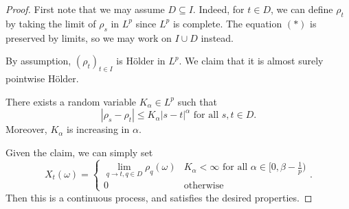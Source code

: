 \documentclass[a4paper]{article}
\begin{document}
\begin{proof}
  First note that we may assume $D \subseteq I$. Indeed, for $t \in D$, we can define $\rho_t$ by taking the limit of $\rho_s$ in $L^p$ since $L^p$ is complete. The equation $(*)$ is preserved by limits, so we may work on $I \cup D$ instead.

  By assumption, $(\rho_t)_{t \in I}$ is H\"older in $L^p$. We claim that it is almost surely pointwise H\"older.
  \begin{claim}
    There exists a random variable $K_\alpha \in L^p$ such that
    \[
      |\rho_s - \rho_t| \leq K_\alpha |s - t|^\alpha\text{ for all }s, t \in D.
    \]
    Moreover, $K_\alpha$ is increasing in $\alpha$.
  \end{claim}
  Given the claim, we can simply set
  \[
    X_t(\omega) =
    \begin{cases}
      \lim_{q \to t, q \in D} \rho_q(\omega) & K_\alpha < \infty\text{ for all }\alpha \in [0, \beta - \frac{1}{p})\\
      0 & \text{otherwise}
    \end{cases}.
  \]
  Then this is a continuous process, and satisfies the desired properties.


\end{proof}
\end{document}
